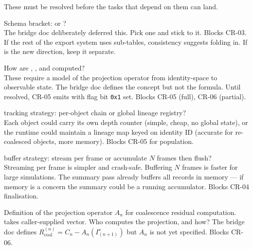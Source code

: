 \documentclass[11pt, a4paper]{article}
\begin{document}
These must be resolved before the tasks that depend on them can land.

\vspace{6pt}
\begin{description}[leftmargin=2cm, style=nextline, font=\sffamily\bfseries\small]

  \item[DEC-01 \hfill \stbd]
    Schema bracket:  or
    ?\\
    {\small The bridge doc deliberately deferred this. Pick one and stick to it.
    Blocks CR-03. If the rest of the export system uses \code{[export.*]}
    sub-tables, consistency suggests folding in. If \code{[outputs.*]} is the
    new direction, keep it separate.}

  \item[DEC-02 \hfill \stbd]
    How are , , and
     computed?\\
    {\small These require a model of the projection operator from identity-space to
    observable state. The bridge doc defines the concept but not the formula. Until
    resolved, CR-05 emits  with flag bit \texttt{0x1} set. Blocks CR-05
    (full), CR-06 (partial).}

  \item[DEC-03 \hfill \stbd]
     tracking strategy: per-object chain or global lineage
    registry?\\
    {\small Each object could carry its own depth counter (simple, cheap, no global
    state), or the runtime could maintain a lineage map keyed on identity ID
    (accurate for re-coalesced objects, more memory). Blocks CR-05 for
     population.}

  \item[DEC-04 \hfill \stbd]
     buffer strategy: stream per frame or accumulate $N$ frames
    then flush?\\
    {\small Streaming per frame is simpler and crash-safe. Buffering $N$ frames is
    faster for large simulations. The summary pass already buffers all records in
    memory --- if memory is a concern the summary could be a running accumulator.
    Blocks CR-04 finalisation.}

  \item[DEC-05 \hfill \stbd]
    Definition of the projection operator $A_n$ for coalescence residual
    computation.\\
    {\small {} takes caller-supplied
     vector. Who computes the projection, and how?
    The bridge doc defines
    $R_{\text{coal}}^{(n)} = C_n - A_n(I^{\star}_{(n+1)})$
    but $A_n$ is not yet specified. Blocks CR-06.}

\end{description}
\end{document}
